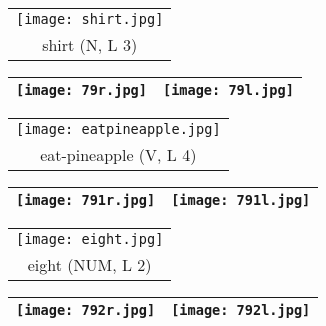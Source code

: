 \documentclass{tufte-book}
\begin{document}
\begin{fullwidth}
 \begin{table*}[h!]
\begin{tabular}{c}
   \texttt{[image: shirt.jpg]}\\
    shirt (N, L 3)\\%
  
  \end{tabular}
\end{table*}
\newpage

     \begin{table}[h!]
\begin{tabular}{|c|c|}
\hline
\texttt{[image: 79r.jpg]} & \texttt{[image: 79l.jpg]}\\
\hline
\end{tabular}
\label{page:79}
\end{table}

 \begin{table*}[h!]
\begin{tabular}{c}
   \texttt{[image: eatpineapple.jpg]}\\
    eat-pineapple (V, L 4)\\%
  
  \end{tabular}
\end{table*}


     \begin{table}[h!]
\begin{tabular}{|c|c|}
\hline
\texttt{[image: 791r.jpg]} & \texttt{[image: 791l.jpg]}\\
\hline
\end{tabular}
\label{page:791}
\end{table}

 \begin{table*}[h!]
\begin{tabular}{c}
   \texttt{[image: eight.jpg]}\\
   eight (NUM, L 2)\\%
  
  \end{tabular}
\end{table*}


     \begin{table}[h!]
\begin{tabular}{|c|c|}
\hline
\texttt{[image: 792r.jpg]} & \texttt{[image: 792l.jpg]}\\
\hline
\end{tabular}
\label{page:792}
\end{table}


\end{fullwidth}
\end{document}
